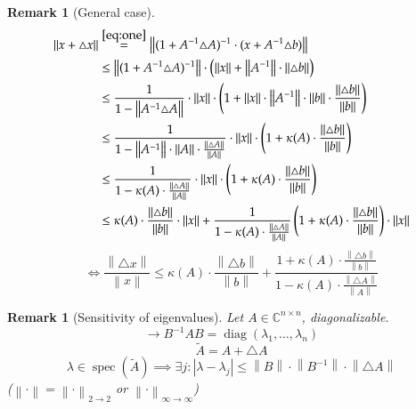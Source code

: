 \documentclass{article}
\newcounter{lecref}[section]
\numberwithin{lecref}{section}
\newtheorem{remark}[lecref]{Remark}
\newcommand{\norm}[1]{\left\|#1\right\|}
\newcommand{\card}[1]{\left|#1\right|}
\begin{document}
\begin{remark}[General case]
  \begin{align}
    \norm{x + \triangle x} &\overset{\eqref{eq:one}}{=} \norm{(1 + A^{-1} \triangle A)^{-1} \cdot (x + A^{-1} \triangle b)} \label{eq:three} \\
      &\leq \norm{(1 + A^{-1} \triangle A)^{-1}} \cdot \left(\norm{x} + \norm{A^{-1}} \cdot \norm{\triangle b}\right) \nonumber \\
      &\leq \frac{1}{1 - \norm{A^{-1} \triangle A}} \cdot \norm{x} \cdot \left(1 + \norm{x} \cdot \norm{A^{-1}} \cdot \norm{b} \cdot \frac{\norm{\triangle b}}{\norm{b}}\right) \nonumber \\
      &\leq \frac{1}{1 - \norm{A^{-1}} \cdot \norm{A} \cdot \frac{\norm{\triangle A}}{\norm{A}}} \cdot \norm{x} \cdot \left(1 + \kappa(A) \cdot \frac{\norm{\triangle b}}{\norm{b}}\right) \nonumber \\
      &\leq \frac{1}{1 - \kappa(A) \cdot \frac{\norm{\triangle A}}{\norm{A}}} \cdot \norm{x} \cdot \left(1 + \kappa(A) \cdot \frac{\norm{\triangle b}}{\norm{b}}\right) \nonumber \\
      &\leq \kappa(A) \cdot \frac{\norm{\triangle b}}{\norm{b}} \cdot \norm{x} + \frac{1}{1 - \kappa(A) \cdot \frac{\norm{\triangle A}}{\norm{A}}} \left(1 + \kappa(A) \cdot \frac{\norm{\triangle b}}{\norm{b}}\right) \cdot \norm{x}
  \end{align}
  \[ \iff \frac{\norm{\triangle x}}{\norm{x}} \leq \kappa(A) \cdot \frac{\norm{\triangle b}}{\norm{b}} + \frac{1 + \kappa(A) \cdot \frac{\norm{\triangle b}}{\norm{b}}}{1 - \kappa(A) \cdot \frac{\norm{\triangle A}}{\norm{A}}} \]
\end{remark}

\begin{remark}[Sensitivity of eigenvalues] %
  Let $A \in \mathbb C^{n \times n}$, diagonalizable.
  \[ \to B^{-1} AB = \operatorname{diag}(\lambda_1, \dots, \lambda_n) \]
  \[ \tilde A = A + \triangle A \]
  \[ \lambda \in \operatorname{spec}(\tilde A) \implies \exists j: \card{\lambda - \lambda_j} \leq \norm{B} \cdot \norm{B^{-1}} \cdot \norm{\triangle A} \]
  ($\norm{\cdot} = \norm{\cdot}_{2 \to 2}$ or $\norm{\cdot}_{\infty\to\infty}$)
\end{remark}
\end{document}
